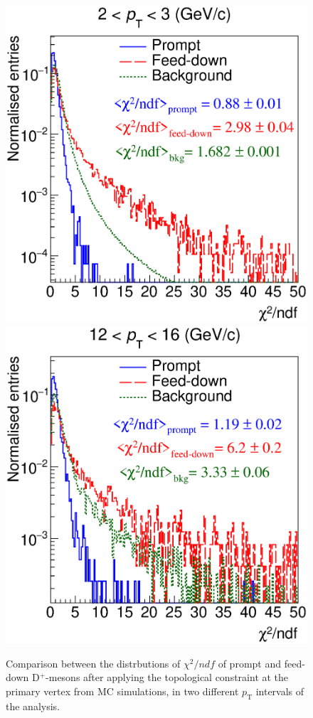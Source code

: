 \documentclass[b5paper,10pt,twoside,oldstyle,classica]{toptesi}
\newcommand{\pt}{p_\text{T}}
\begin{document}
\begin{figure}[tb]
\begin{center}
{\includegraphics[scale = 0.32]{KFchi_Dplus_pT1.eps}}
\hspace{-0.5cm}
{\includegraphics[scale = 0.32]{KFchi_Dplus_pT8.eps}}
\caption{Comparison between the distrbutions of $\chi^2/ndf$ of prompt and feed-down D$^+$-mesons after applying the topological constraint at the primary vertex from MC simulations, in two different $\pt$ intervals of the analysis.}
\label{KF_chi}
\end{center}
\end{figure} 
\end{document}
